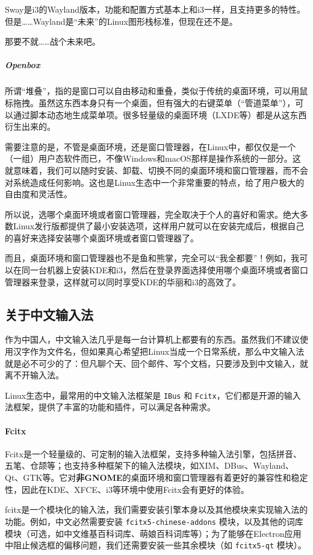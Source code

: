 Sway是i3的Wayland版本，功能和配置方式基本上和i3一样，且支持更多的特性。但是……Wayland是“未来”的Linux图形栈标准，但现在还不是。

那要不就……战个未来吧。

\subparagraph{Openbox} 所谓“堆叠”，指的是窗口可以自由移动和重叠，类似于传统的桌面环境，可以用鼠标拖拽。虽然这东西本身只有一个桌面，但有强大的右键菜单（“管道菜单”），可以通过脚本动态地生成菜单项。很多轻量级的桌面环境（LXDE等）都是从这东西衍生出来的。

需要注意的是，不管是桌面环境，还是窗口管理器，在Linux中，都仅仅是一个（一组）用户态软件而已，不像Windows和macOS那样是操作系统的一部分。这就意味着，我们可以随时安装、卸载、切换不同的桌面环境和窗口管理器，而不会对系统造成任何影响。这也是Linux生态中一个非常重要的特点，给了用户极大的自由度和灵活性。

所以说，选哪个桌面环境或者窗口管理器，完全取决于个人的喜好和需求。绝大多数Linux发行版都提供了最小安装选项，这样用户就可以在安装完成后，根据自己的喜好来选择安装哪个桌面环境或者窗口管理器了。

而且，桌面环境和窗口管理器也不是鱼和熊掌，完全可以“我全都要”！例如，我可以在同一台机器上安装KDE和i3，然后在登录界面选择使用哪个桌面环境或者窗口管理器来登录，这样就可以同时享受KDE的华丽和i3的高效了。

\subsection{关于中文输入法}

作为中国人，中文输入法几乎是每一台计算机上都要有的东西。虽然我们不建议使用汉字作为文件名，但如果真心希望把Linux当成一个日常系统，那么中文输入法就是必不可少的了：但凡聊个天、回个邮件、写个文档，只要涉及到中文输入，就离不开输入法。

Linux生态中，最常用的中文输入法框架是 \verb|IBus| 和 \verb|Fcitx|，它们都是开源的输入法框架，提供了丰富的功能和插件，可以满足各种需求。

\paragraph{Fcitx} Fcitx是一个轻量级的、可定制的输入法框架，支持多种输入法引擎，包括拼音、五笔、仓颉等；也支持多种框架下的输入法模块，如XIM、DBus、Wayland、Qt、GTK等。它对\textbf{非GNOME}的桌面环境和窗口管理器有着更好的兼容性和稳定性，因此在KDE、XFCE、i3等环境中使用Fcitx会有更好的体验。

fcitx是一个模块化的输入法，我们需要安装引擎本身以及其他模块来实现输入法的功能。例如，中文必然需要安装 \verb|fcitx5-chinese-addons| 模块，以及其他的词库模块（可选，如中文维基百科词库、萌娘百科词库等）；为了能够在Electron应用中阻止候选框的偏移问题，我们还需要安装一些其余模块（如 \verb|fcitx5-qt| 模块）。

